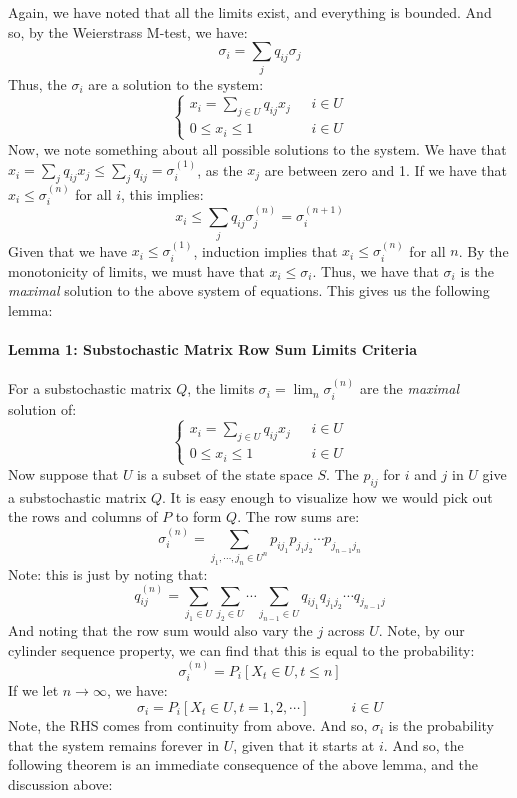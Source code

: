 \documentclass[12pt,a4paper]{article}
\newcommand{\1}[1]{\mathbbm{1}\left\{ #1 \right\}}
\begin{document}
Again, we have noted that all the limits exist, and everything is bounded. And so, by the Weierstrass M-test, we have:
$$
	\sigma_i = \sum_j q_{ij} \sigma_j
$$
Thus, the $\sigma_i$ are a solution to the system:
$$
	\begin{cases}
	x_i = \sum_{j \in U} q_{ij} x_j & \text{ $i \in U$}\\
	0 \leq x_i \leq 1 & \text{ $i \in U$}
	\end{cases}
$$
Now, we note something about all possible solutions to the system. We have that $x_i = \sum_j q_{ij} x_j \leq \sum_j q_{ij} = \sigma_i^{(1)}$, as the $x_j$ are between zero and 1. If we have that $x_i \leq \sigma_i^{(n)}$ for all $i$, this implies:
$$
	x_i \leq \sum_j q_{ij} \sigma_j^{(n)} = \sigma_i^{(n+1)}
$$
Given that we have $x_i \leq \sigma_i^{(1)}$, induction implies that $x_i \leq \sigma_i^{(n)}$ for all $n$. By the monotonicity of limits, we must have that $x_i \leq \sigma_i$. Thus, we have that $\sigma_i$ is the \textit{maximal} solution to the above system of equations. This gives us the following lemma:

\paragraph{Lemma 1: Substochastic Matrix Row Sum Limits Criteria} For a substochastic matrix $Q$, the limits $\sigma_i = \lim_n \sigma_i^{(n)}$ are the \textit{maximal} solution of:
$$
	\begin{cases}
	x_i = \sum_{j \in U} q_{ij} x_j & \text{ $i \in U$}\\
	0 \leq x_i \leq 1 & \text{ $i \in U$}
	\end{cases}
$$
Now suppose that $U$ is a subset of the state space $S$. The $p_{ij}$ for $i$ and $j$ in $U$ give a substochastic matrix $Q$. It is easy enough to visualize how we would pick out the rows and columns of $P$ to form $Q$. The row sums are:
$$
	\sigma_i^{(n)} = \sum_{j_1, \cdots, j_n \in U^n} p_{ij_1}p_{j_1j_2} \cdots p_{j_{n-1}j_n}
$$
Note: this is just by noting that:
$$
	q_{ij}^{(n)} = \sum_{j_1 \in U} \sum_{j_2 \in U} \cdots \sum_{j_{n-1} \in U} q_{ij_1}q_{j_1j_2} \cdots q_{j_{n-1}j}
$$
And noting that the row sum would also vary the $j$ across $U$. Note, by our cylinder sequence property, we can find that this is equal to the probability:
$$
	\sigma_i^{(n)} = P_i\left[X_t \in U, t \leq n\right]
$$
If we let $n \to \infty$, we have:
$$
	\sigma_i = P_i\left[X_t \in U, t = 1, 2, \cdots\right] \quad\quad\quad i \in U
$$
Note, the RHS comes from continuity from above. And so, $\sigma_i$ is the probability that the system remains forever in $U$, given that it starts at $i$. And so, the following theorem is an immediate consequence of the above lemma, and the discussion above:
\end{document}
